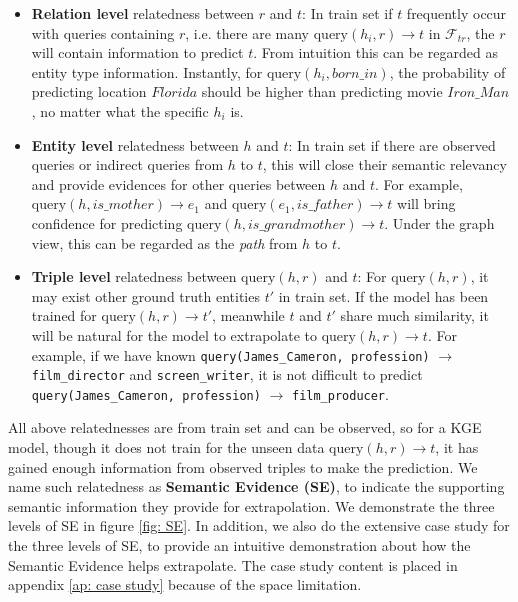 \documentclass[letterpaper]{article} \usepackage{aaai22}  \usepackage{times}  \usepackage{helvet}  \usepackage{courier}  \usepackage[hyphens]{url}  \usepackage{graphicx} \urlstyle{rm} \def\UrlFont{\rm}  \usepackage{natbib}  \usepackage{caption} \DeclareCaptionStyle{ruled}{labelfont=normalfont,labelsep=colon,strut=off} \frenchspacing  \setlength{\pdfpagewidth}{8.5in}  \setlength{\pdfpageheight}{11in}  \usepackage{algorithm}
\begin{document}
\begin{itemize}
    \item \textbf{Relation level} relatedness between $r$ and $t$: In train set if $t$ frequently occur with queries containing $r$, i.e. there are many $\mathrm{query}(h_i, r) \rightarrow t$ in $\mathcal{F}_{tr}$, the $r$ will contain information to predict $t$. From intuition this can be regarded as entity type information. Instantly, for $\mathrm{query}(h_i, born\_in)$, the probability of predicting location $Florida$ should be higher than predicting movie $Iron\_Man$, no matter what the specific $h_i$ is.
    \item \textbf{Entity level} relatedness between $h$ and $t$: In train set if there are observed queries or indirect queries from $h$ to $t$, this will close their semantic relevancy and provide evidences for other queries between $h$ and $t$. 
    For example, $\mathrm{query}(h, is\_mother) \rightarrow e_1$ and $\mathrm{query}(e_1, is\_father) \rightarrow t$ will bring confidence for predicting $\mathrm{query}(h, is\_grandmother) \rightarrow t$. Under the graph view, this can be regarded as the \textit{path} from $h$ to $t$. 
    \item \textbf{Triple level} relatedness between $\mathrm{query}(h, r)$ and $t$: For $\mathrm{query}(h, r)$, it may exist other ground truth entities $t'$ in train set. If the model has been trained for $\mathrm{query}(h, r) \rightarrow t'$, meanwhile $t$ and $t'$ share much similarity, it will be natural for the model to extrapolate to $\mathrm{query}(h, r) \rightarrow t$. For example, if we have known \texttt{query(James\_Cameron, profession)} $\rightarrow$ \texttt{film\_director} and \texttt{screen\_writer}, it is not difficult to predict \texttt{query(James\_Cameron, profession)} $\rightarrow$ \texttt{film\_producer}.
\end{itemize}

All above relatednesses are from train set and can be observed, so for a KGE model, though it does not train for the unseen data $\mathrm{query}(h, r) \rightarrow t$, it has gained enough information from observed triples to make the prediction. We name such relatedness as \textbf{Semantic Evidence (SE)}, to indicate the supporting semantic information they provide for extrapolation. We demonstrate the three levels of SE in figure \ref{fig: SE}. In addition, we also do the extensive case study for the three levels of SE, to provide an intuitive demonstration about how the Semantic Evidence helps extrapolate. The case study content is placed in appendix \ref{ap: case study} because of the space limitation. 
\end{document}

